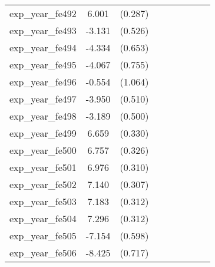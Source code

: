 {\begin{tabular}{l*{4}{cc}}
exp\_year\_fe492&    6.001\sym{***}&  (0.287)&                  &         &                  &         &                  &         \\
exp\_year\_fe493&   -3.131\sym{***}&  (0.526)&                  &         &                  &         &                  &         \\
exp\_year\_fe494&   -4.334\sym{***}&  (0.653)&                  &         &                  &         &                  &         \\
exp\_year\_fe495&   -4.067\sym{***}&  (0.755)&                  &         &                  &         &                  &         \\
exp\_year\_fe496&   -0.554         &  (1.064)&                  &         &                  &         &                  &         \\
exp\_year\_fe497&   -3.950\sym{***}&  (0.510)&                  &         &                  &         &                  &         \\
exp\_year\_fe498&   -3.189\sym{***}&  (0.500)&                  &         &                  &         &                  &         \\
exp\_year\_fe499&    6.659\sym{***}&  (0.330)&                  &         &                  &         &                  &         \\
exp\_year\_fe500&    6.757\sym{***}&  (0.326)&                  &         &                  &         &                  &         \\
exp\_year\_fe501&    6.976\sym{***}&  (0.310)&                  &         &                  &         &                  &         \\
exp\_year\_fe502&    7.140\sym{***}&  (0.307)&                  &         &                  &         &                  &         \\
exp\_year\_fe503&    7.183\sym{***}&  (0.312)&                  &         &                  &         &                  &         \\
exp\_year\_fe504&    7.296\sym{***}&  (0.312)&                  &         &                  &         &                  &         \\
exp\_year\_fe505&   -7.154\sym{***}&  (0.598)&                  &         &                  &         &                  &         \\
exp\_year\_fe506&   -8.425\sym{***}&  (0.717)&                  &         &                  &         &                  &         \\

\end{tabular}}
